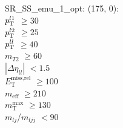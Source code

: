 SR\_SS\_emu\_1\_opt: (175, 0): \\
$p_{\text{T}}^{l1}$ $\geq 30$ \\
$p_{\text{T}}^{l2}$ $\geq 25$ \\
$p_{\text{T}}^{ll}$ $\geq 40$ \\
$m_{T2}$ $\geq 60$ \\
$|\Delta\eta_{ll}|$ $<1.5$ \\
$E_{\text{T}}^{\text{miss,rel}}$ $\geq 100$ \\
$m_{\text{eff}}$ $\geq 210$ \\
$m_{\text{T}}^{\text{max}}$ $\geq 130$ \\
$m_{lj}$/$m_{ljj}$ $<90$ \\
